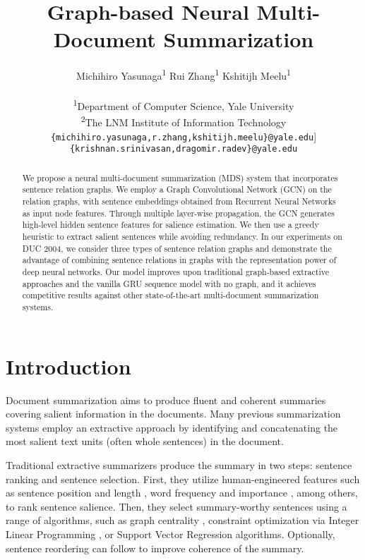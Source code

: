 \documentclass[11pt,a4paper]{article}
\title{Graph-based Neural Multi-Document Summarization}
\author{
	    Michihiro Yasunaga\textsuperscript{1} \quad Rui Zhang\textsuperscript{1} \quad Kshitijh Meelu\textsuperscript{1} \\ \quad {\bf Ayush Pareek\textsuperscript{2}} \quad {\bf Krishnan Srinivasan\textsuperscript{1}} \quad {\bf Dragomir Radev\textsuperscript{1}}\\
  	    \textsuperscript{1}Department of Computer Science, Yale University\\
  	    \textsuperscript{2}The LNM Institute of Information Technology\\
        {\small {\tt \{michihiro.yasunaga,r.zhang,kshitijh.meelu\}@yale.edu}}\-1mm]
        {\small{\tt \{krishnan.srinivasan,dragomir.radev\}@yale.edu}}
}
\date{}
\begin{document}
\setlength{\abovedisplayskip}{6pt}
\setlength{\belowdisplayskip}{5pt}
        
\maketitle
\begin{abstract}
We propose a neural multi-document summarization (MDS) system that incorporates sentence relation graphs.
We employ a Graph Convolutional Network (GCN) on the relation graphs, with sentence embeddings obtained from Recurrent Neural Networks as input node features.
Through multiple layer-wise propagation, the GCN generates high-level hidden sentence features for salience estimation.
We then use a greedy heuristic to extract salient sentences while avoiding redundancy.
In our experiments on DUC 2004, we consider three types of sentence relation graphs and demonstrate the advantage of combining sentence relations in graphs with the representation power of deep neural networks.
Our model improves upon traditional graph-based extractive approaches and the vanilla GRU sequence model with no graph, and it achieves competitive results against other state-of-the-art multi-document summarization systems.
\end{abstract}

\section{Introduction}
Document summarization aims to produce fluent and coherent summaries covering salient information in the documents.
Many previous summarization systems employ an extractive approach by identifying and concatenating the most salient text units (often whole sentences) in the document. 
  
Traditional extractive summarizers produce the summary in two steps: sentence ranking and sentence selection.
First, they utilize human-engineered features such as sentence position and length \cite{radev2004mead}, word frequency and importance \cite{nenkova2006compositional,hong2014improving}, among others, to rank sentence salience.
Then, they select summary-worthy sentences using a range of algorithms, such as graph centrality \cite{erkan2004lexrank}, constraint optimization via Integer Linear Programming \cite{mcdonald2007study,gillick2009scalable,li2013using}, or Support Vector Regression \cite{li2007multi} algorithms.
Optionally, sentence reordering \cite{lapata2003probabilistic,barzilay2001sentence} can follow to improve coherence of the summary.
\end{document}
